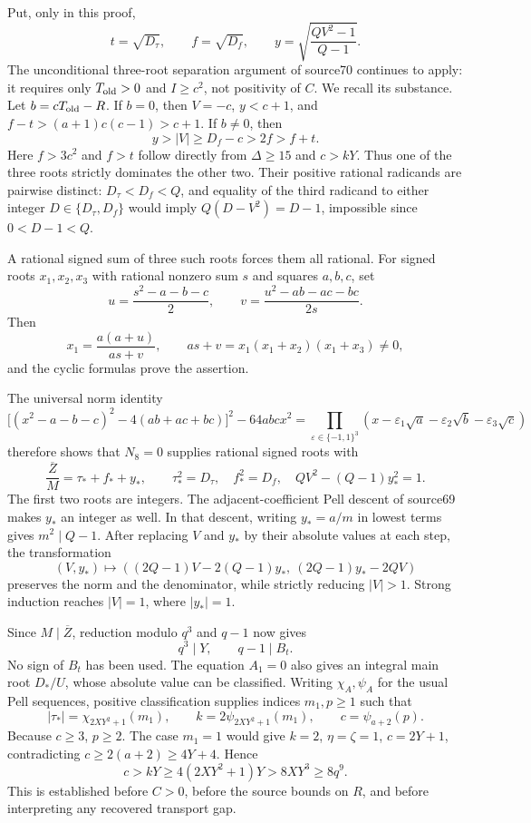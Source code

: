 Put, only in this proof,
\[
 t=\sqrt{D_\tau},\qquad f=\sqrt{D_f},\qquad
 y=\sqrt{\frac{QV^2-1}{Q-1}}.
\]
The unconditional three-root separation argument of source70 continues to
apply: it requires only $T_{\rm old}>0$ and $I\ge c^2$, not positivity of
$C$. We recall its substance. Let $b=cT_{\rm old}-R$. If $b=0$, then
$V=-c$, $y<c+1$, and $f-t>(a+1)c(c-1)>c+1$. If $b\ne0$, then
\[
 y>|V|\ge D_f-c>2f>f+t.
\]
Here $f>3c^2$ and $f>t$ follow directly from $\Delta\ge15$ and
$c>kY$. Thus one of the three roots strictly dominates the other two.
Their positive rational radicands are pairwise distinct: $D_\tau<D_f<Q$,
and equality of the third radicand to either integer $D\in\{D_\tau,D_f\}$
would imply $Q(D-V^2)=D-1$, impossible since $0<D-1<Q$.

A rational signed sum of three such roots forces them all rational. For
signed roots $x_1,x_2,x_3$ with rational nonzero sum $s$ and squares $a,b,c$,
set
\[
 u=\frac{s^2-a-b-c}{2},\qquad
 v=\frac{u^2-ab-ac-bc}{2s}.
\]
Then
\[
 x_1=\frac{a(a+u)}{as+v},\qquad
 as+v=x_1(x_1+x_2)(x_1+x_3)\ne0,
\]
and the cyclic formulas prove the assertion.

The universal norm identity
\[
 \bigl[(x^2-a-b-c)^2-4(ab+ac+bc)\bigr]^2-64abcx^2
 =\prod_{\varepsilon\in\{-1,1\}^3}
 (x-\varepsilon_1\sqrt a-\varepsilon_2\sqrt b-\varepsilon_3\sqrt c)
\]
therefore shows that $N_8=0$ supplies rational signed roots with
\[
 \frac{\overline Z}{M}=\tau_*+f_*+y_*,\qquad
 \tau_*^2=D_\tau,\quad f_*^2=D_f,\quad
 QV^2-(Q-1)y_*^2=1.
\]
The first two roots are integers. The adjacent-coefficient Pell descent
of source69 makes $y_*$ an integer as well. In that descent, writing
$y_*=a/m$ in lowest terms gives $m^2\mid Q-1$. After replacing $V$ and
$y_*$ by their absolute values at each step, the transformation
\[
 (V,y_*)\longmapsto
 ((2Q-1)V-2(Q-1)y_*,\ (2Q-1)y_*-2QV)
\]
preserves the norm and the denominator, while strictly reducing $|V|>1$.
Strong induction reaches $|V|=1$, where $|y_*|=1$.

Since $M\mid\overline Z$, reduction modulo $q^3$ and $q-1$ now gives
\[
 q^3\mid Y,\qquad q-1\mid B_t.
\]
No sign of $B_t$ has been used. The equation $A_1=0$ also gives an
integral main root $D_*/U$, whose absolute value can be classified.
Writing $\chi_A,\psi_A$ for the usual Pell sequences, positive
classification supplies indices $m_1,p\ge1$ such that
\[
 |\tau_*|=\chi_{2XY^2+1}(m_1),\qquad
 k=2\psi_{2XY^2+1}(m_1),\qquad c=\psi_{a+2}(p).
\]
Because $c\ge3$, $p\ge2$. The case $m_1=1$ would give
$k=2$, $\eta=\zeta=1$, $c=2Y+1$, contradicting
$c\ge2(a+2)\ge4Y+4$. Hence
\begin{equation}\label{eq:offset-early-c}
 c>kY\ge4(2XY^2+1)Y>8XY^3\ge8q^9.
\end{equation}
This is established before $C>0$, before the source bounds on $R$, and
before interpreting any recovered transport gap.


